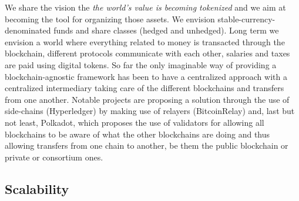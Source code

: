 \documentclass[9pt,oneside]{amsart}
\begin{document}
\begin{multicols}{2}
We share the vision the \textit{the world's value is becoming tokenized} and we aim at becoming the tool for organizing those assets. We envision stable-currency-denominated funds and share classes (hedged and unhedged). Long term we envision a world where everything related to money is transacted through the blockchain, different protocols communicate with each other, salaries and taxes are paid using digital tokens. So far the only imaginable way of providing a blockchain-agnostic framework has been to have a centralized approach with a centralized intermediary taking care of the different blockchains and transfers from one another. Notable projects are proposing a solution through the use of side-chains (Hyperledger) by making use of relayers (BitcoinRelay) and, last but not least, Polkadot, which proposes the use of validators for allowing all blockchains to be aware of what the other blockchains are doing and thus allowing transfers from one chain to another, be them the public blockchain or private or consortium ones.

\subsection{Scalability}


\end{multicols}
\end{document}
